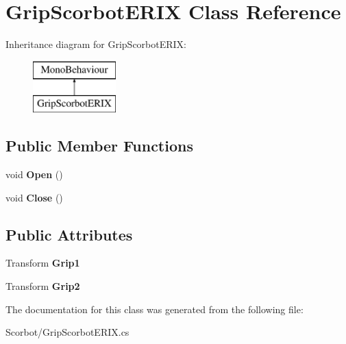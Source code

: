 \hypertarget{class_grip_scorbot_e_r_i_x}{}\section{Grip\+Scorbot\+E\+R\+IX Class Reference}
\label{class_grip_scorbot_e_r_i_x}
Inheritance diagram for Grip\+Scorbot\+E\+R\+IX\+:\begin{figure}[H]
\begin{center}
\leavevmode
\includegraphics[height=2.000000cm]{class_grip_scorbot_e_r_i_x}
\end{center}
\end{figure}
\subsection*{Public Member Functions}
\begin{DoxyCompactItemize}
\item 
\mbox{\label{class_grip_scorbot_e_r_i_x_a0c3b7287d1a56a1e7e00228a0dbe1a34}} 
void {\bfseries Open} ()
\item 
\mbox{\label{class_grip_scorbot_e_r_i_x_a05f7c7720d01ab46bd5cd499b5f83646}} 
void {\bfseries Close} ()
\end{DoxyCompactItemize}
\subsection*{Public Attributes}
\begin{DoxyCompactItemize}
\item 
\mbox{\label{class_grip_scorbot_e_r_i_x_a2facabd0fc50809175ecd2d6e5d96a23}} 
Transform {\bfseries Grip1}
\item 
\mbox{\label{class_grip_scorbot_e_r_i_x_adedacde16a4a9fb8a5ba5431a54beee4}} 
Transform {\bfseries Grip2}
\end{DoxyCompactItemize}


The documentation for this class was generated from the following file\+:\begin{DoxyCompactItemize}
\item 
Scorbot/Grip\+Scorbot\+E\+R\+I\+X.\+cs\end{DoxyCompactItemize}
